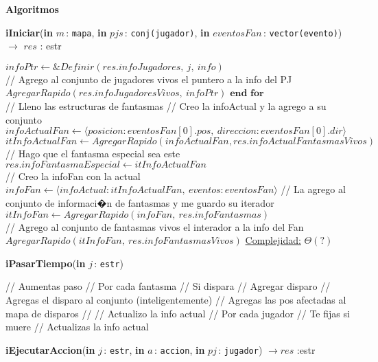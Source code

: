 \documentclass[a4paper,10pt]{article}
\let\TipoVariable=\texttt
\let\ModificadorArgumento=\textbf
\newcommand{\tab}{\hspace*{7mm}}
\newcommand{\In}[2]{\ModificadorArgumento{in} \ensuremath{#1}\,: \TipoVariable{#2}\xspace}
\newenvironment{Algoritmos}{%
  \vspace*{2ex}%
  \noindent\textbf{\Large Algoritmos}%
  \vspace*{2ex}%
}{}
\newcommand{\tuple}[1]{\langle #1 \rangle}
\begin{document}
{\begin{Algoritmos}
\begin{algorithm}[H]{\textbf{iIniciar}(\In{m}{mapa}, \In{pjs}{conj(jugador)}, \In{eventosFan}{vector(evento)}) $\to$ $res$ : estr}
\begin{algorithmic}[1]
        \State \tab $infoPtr \gets \& Definir(res.infoJugadores,\ j,\ info)$
        \\
        \State \tab // Agrego al conjunto de jugadores vivos el puntero a la info del PJ
        \State \tab $AgregarRapido(res.infoJugadoresVivos,\ infoPtr)$
        \State $\textbf{end for}$
        \\
        \State // Lleno las estructuras de fantasmas
        \State // Creo la infoActual y la agrego a su conjunto
        \State $infoActualFan \gets \tuple{posicion: eventosFan[0].pos,\ direccion: eventosFan[0].dir}$
        \State $itInfoActualFan \gets AgregarRapido(infoActualFan, res.infoActualFantasmasVivos)$
        \\
        \State // Hago que el fantasma especial sea este
        \State $res.infoFantasmaEspecial \gets itInfoActualFan$
        \\
        \State // Creo la infoFan con la actual
        \State $infoFan \gets \tuple{infoActual: itInfoActualFan,\ eventos: eventosFan}$
        \State // La agrego al conjunto de informaci�n de fantasmas y me guardo su iterador
        \State $itInfoFan \gets AgregarRapido(infoFan,\ res.infoFantasmas)$
        \\
        \State // Agrego al conjunto de fantasmas vivos el interador a la info del Fan
        \State $AgregarRapido(itInfoFan,\ res.infoFantasmasVivos)$
        \medskip
        \Statex \underline{Complejidad:} $\Theta(?)$
        \end{algorithmic}
  \end{algorithm}

  \begin{algorithm}[H]{\textbf{iPasarTiempo}(\In{j}{estr})}
    \begin{algorithmic}[1]
      \State
      // Aumentas paso
      // Por cada fantasma
      //  Si dispara
      //    Agregar disparo
      //      Agregas el disparo al conjunto (inteligentemente)
      //      Agregas las pos afectadas al mapa de disparos
      //    
      //  Actualizo la info actual
      // Por cada jugador
      //  Te fijas si muere
      //  Actualizas la info actual
    \end{algorithmic}
  \end{algorithm}

  \begin{algorithm}[H]{\textbf{iEjecutarAccion}(\In{j}{estr}, \In{a}{accion}, \In{pj}{jugador}) $\to res$ :estr}
    \begin{algorithmic}[1]
      \State
    \end{algorithmic}
  \end{algorithm}



\end{Algoritmos}}
\end{document}
